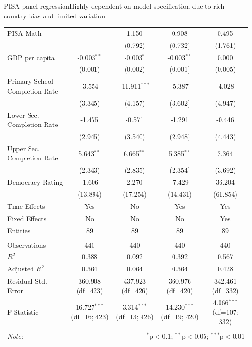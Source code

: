 \documentclass[10pt]{beamer}
\begin{document}
\begin{frame}{PISA panel regression}{Highly dependent on model specification due to rich country bias and limited variation}
\begin{table}[!htbp]
{\begin{tabular}{@{\extracolsep{5pt}}lcccc}
                 PISA Math & & 1.150$^{}$ & 0.908$^{}$ & 0.495$^{}$ \\
                & & (0.792) & (0.732) & (1.761) \\
                 GDP per capita & -0.003$^{**}$ & -0.003$^{*}$ & -0.003$^{**}$ & 0.000$^{}$ \\
                & (0.001) & (0.002) & (0.001) & (0.005) \\
                 Primary School Completion Rate & -3.554$^{}$ & -11.911$^{***}$ & -5.387$^{}$ & -4.028$^{}$ \\
                & (3.345) & (4.157) & (3.602) & (4.947) \\
                 Lower Sec. Completion Rate & -1.475$^{}$ & -0.571$^{}$ & -1.291$^{}$ & -0.446$^{}$ \\
                & (2.945) & (3.540) & (2.948) & (4.443) \\
                 Upper Sec. Completion Rate & 5.643$^{**}$ & 6.665$^{**}$ & 5.385$^{**}$ & 3.364$^{}$ \\
                & (2.343) & (2.835) & (2.354) & (3.692) \\
                 Democracy Rating & -1.606$^{}$ & 2.270$^{}$ & -7.429$^{}$ & 36.204$^{}$ \\
                & (13.894) & (17.254) & (14.431) & (61.854) \\
                 Time Effects & Yes & No & Yes & Yes \\
                 Fixed Effects & No & No & No & Yes \\
                 Entities & 89 & 89 & 89 & 89 \\
                \hline \\[-1.8ex]
                 Observations & 440 & 440 & 440 & 440 \\
                 $R^2$ & 0.388 & 0.092 & 0.392 & 0.567 \\
                 Adjusted $R^2$ & 0.364 & 0.064 & 0.364 & 0.428 \\
                 Residual Std. Error & 360.908 (df=423) & 437.923 (df=426) & 360.976 (df=420) & 342.461 (df=332) \\
                 F Statistic & 16.727$^{***}$ (df=16; 423) & 3.314$^{***}$ (df=13; 426) & 14.230$^{***}$ (df=19; 420) & 4.066$^{***}$ (df=107; 332) \\
                \hline
                \hline \\[-1.8ex]
                \textit{Note:} & \multicolumn{4}{r}{$^{*}$p$<$0.1; $^{**}$p$<$0.05; $^{***}$p$<$0.01} \\
                \end{tabular}
        }
        \end{table}
\end{frame}
\end{document}
